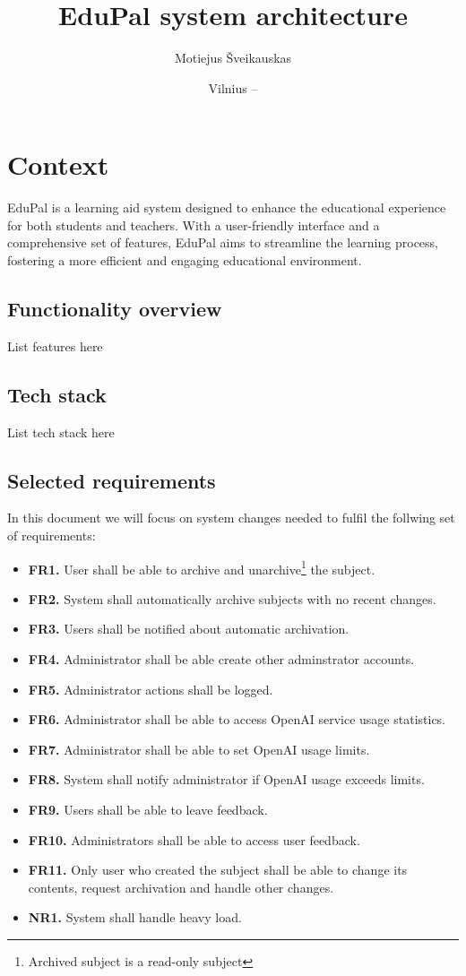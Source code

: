 \documentclass[
    english, %
]{VUMIFPSkursinis}
\title{EduPal system architecture}
\author{Motiejus Šveikauskas}
\date{Vilnius – \the\year}
\begin{document}
\maketitle

\tableofcontents

\section{Context}
EduPal is a learning aid system designed to enhance
the educational experience for both students and teachers. With a user-friendly interface and a comprehensive set of features, EduPal aims to streamline the learning process, fostering a more efficient and engaging educational environment.

\subsection{Functionality overview}
List features here

\subsection{Tech stack}
List tech stack here

\subsection{Selected requirements}
In this document we will focus on system changes needed to fulfil the follwing set of requirements:

\begin{itemize}
    \item \textbf{FR1.} User shall be able to archive and unarchive\footnote{Archived subject is a read-only subject} the subject.
    \item \textbf{FR2.} System shall automatically archive subjects with no recent changes.
    \item \textbf{FR3.} Users shall be notified about automatic archivation.
    \item \textbf{FR4.} Administrator shall be able create other adminstrator accounts.
    \item \textbf{FR5.} Administrator actions shall be logged.
    \item \textbf{FR6.} Administrator shall be able to access OpenAI service usage statistics.
    \item \textbf{FR7.} Administrator shall be able to set OpenAI usage limits.
    \item \textbf{FR8.} System shall notify administrator if OpenAI usage exceeds limits.
    \item \textbf{FR9.} Users shall be able to leave feedback.
    \item \textbf{FR10.} Administrators shall be able to access user feedback.
    \item \textbf{FR11.} Only user who created the subject shall be able to change its contents, request archivation and handle other changes.
    \item \textbf{NR1.} System shall handle heavy load.
\end{itemize}
\end{document}

